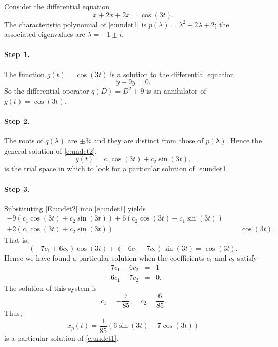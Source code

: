 \documentclass{ximera}
\begin{document}
Consider the differential equation
\begin{equation}  \label{e:undet1}
\ddot x + 2\dot x + 2x = \cos(3t).
\end{equation}
The characteristic polynomial of \eqref{e:undet1} is 
$p(\lambda)=\lambda^2+2\lambda+2$; the associated eigenvalues are 
$\lambda=-1\pm i$.

\paragraph{Step 1.} The function $g(t)=\cos(3t)$ is a solution to the 
differential equation
\begin{equation}  \label{e:undet2}
\ddot y + 9y=0.
\end{equation}
So the differential operator $q(D)=D^2+9$ is an 
annihilator of $g(t)=\cos(3t)$. 

\paragraph{Step 2.} The roots of $q(\lambda)$ are $\pm 3i$ and they are 
distinct from those of $p(\lambda)$.  Hence the 
general solution of \eqref{e:undet2}, 
\begin{equation}   \label{E:undet2}
y(t) = c_1 \cos(3t)+ c_2 \sin(3t),
\end{equation}
is the trial space in which to look for a 
particular solution of \eqref{e:undet1}.

\paragraph{Step 3.} Substituting \eqref{E:undet2} into \eqref{e:undet1} yields
\begin{eqnarray*}
-9(c_1\cos(3t)+c_2 \sin(3t)) +6(c_2\cos(3t)-c_1\sin(3t)) & & \\
+2(c_1 \cos(3t)+ c_2 \sin(3t)) &  = & \cos(3t).
\end{eqnarray*}
That is,
\[
(-7c_1+6c_2)\cos(3t)+(-6c_1-7c_2)\sin(3t) = \cos(3t).
\]
Hence we have found a particular solution when the coefficients $c_1$ and 
$c_2$ satisfy 
\begin{eqnarray*}
-7c_1 +6c_2 & = & 1\\
-6c_1 -7c_2 & = & 0.
\end{eqnarray*}
The solution of this system is 
\[
c_1 = -\frac{7}{85},\quad c_2 = \frac{6}{85}.
\]
Thus, 
\[
x_p(t) = \frac{1}{85}(6\sin(3t)-7\cos(3t))
\]
is a particular solution of \eqref{e:undet1}.
\end{document}
